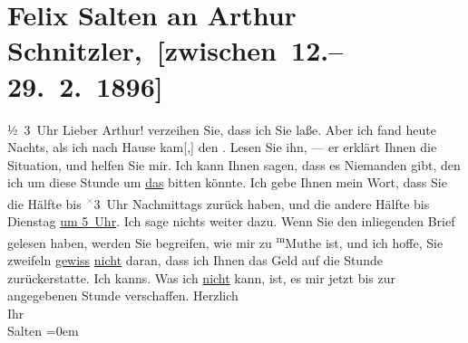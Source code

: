 

         \renewcommand{\erwaehnteOrte}{Orte: Berlin, Wien}
         \renewcommand{\erwaehnteWerke}{}
               \section[ Felix Salten an Arthur Schnitzler, {[}zwischen 12.–29. 2. 1896{]}]{ Felix Salten an Arthur Schnitzler, {[}zwischen 12.–29. 2. 1896{]}}\nopagebreak{}\rehead{ }\begin{ledgroupsized}[t]{13cm}\normalsize\beginnumbering \toendnotes[C]{\smallbreak\pagebreak[2]} 
\toendnotes[C]{\smallbreak}\pstart
           \raggedleft{}{\pb}½ 3 Uhr\pend
           \pstart
           Lieber Arthur! verzeihen Sie, dass ich Sie \label{K_L03168-1v}\label{K_L03168-1h} laße. Aber ich fand heute{ }Nachts, als ich nach Hause kam{[},{]} den \label{K_L03168-2v}\label{K_L03168-2h}. Lesen Sie ihn, — er erklärt
               Ihnen die Situation, und helfen Sie mir. Ich kann Ihnen sagen, dass es Niemanden
               gibt, den ich um diese Stunde um \uline{das} bitten könnte.
               Ich gebe Ihnen mein Wort, dass Sie die Hälfte bis \substVorne{}\textsuperscript{\textcolor{gray}{×}}\substDazwischen{}3\substHinten{} Uhr Nachmittags zurück haben, und die andere Hälfte bis
                  Dienstag{ }{\pb}\uline{um 5 Uhr}. Ich sage nichts weiter dazu. Wenn Sie den inliegenden Brief gelesen haben,
               werden Sie begreifen, wie mir zu \substVorne{}\textsuperscript{m}\substDazwischen{}M\substHinten{}uthe ist, und ich hoffe, Sie zweifeln \uline{gewiss}{ }\uline{nicht} daran, dass ich Ihnen das Geld auf die Stunde
               zurückerstatte. Ich kanns. Was ich \uline{nicht} kann, ist,
               es mir jetzt bis zur angegebenen Stunde verschaffen.\pend
           \pstart
           Herzlich {\\[\baselineskip]}Ihr {\\[\baselineskip]}\spacefill\mbox{Salten}\pend
           \leftskip=0em{}
         

\end{ledgroupsized}
